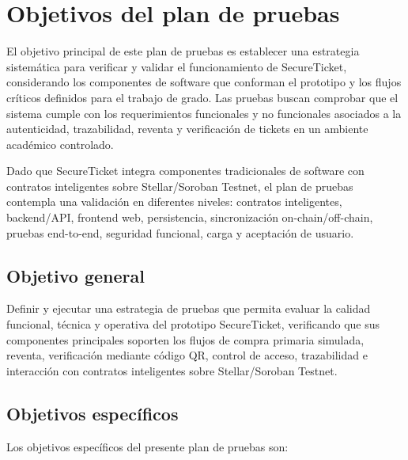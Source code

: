 \documentclass[12pt,letterpaper]{article}
\newcommand{\NombreProyecto}{SecureTicket}
\begin{document}
\section{Objetivos del plan de pruebas}

El objetivo principal de este plan de pruebas es establecer una estrategia sistemática para verificar y validar el funcionamiento de \NombreProyecto{}, considerando los componentes de software que conforman el prototipo y los flujos críticos definidos para el trabajo de grado. Las pruebas buscan comprobar que el sistema cumple con los requerimientos funcionales y no funcionales asociados a la autenticidad, trazabilidad, reventa y verificación de tickets en un ambiente académico controlado.

Dado que \NombreProyecto{} integra componentes tradicionales de software con contratos inteligentes sobre Stellar/Soroban Testnet, el plan de pruebas contempla una validación en diferentes niveles: contratos inteligentes, backend/API, frontend web, persistencia, sincronización on-chain/off-chain, pruebas end-to-end, seguridad funcional, carga y aceptación de usuario.

\subsection{Objetivo general}

Definir y ejecutar una estrategia de pruebas que permita evaluar la calidad funcional, técnica y operativa del prototipo \NombreProyecto{}, verificando que sus componentes principales soporten los flujos de compra primaria simulada, reventa, verificación mediante código QR, control de acceso, trazabilidad e interacción con contratos inteligentes sobre Stellar/Soroban Testnet.

\subsection{Objetivos específicos}

Los objetivos específicos del presente plan de pruebas son:
\end{document}
